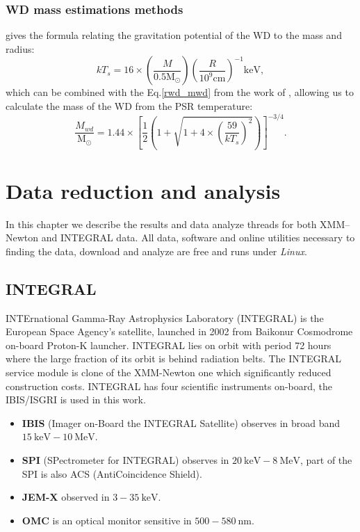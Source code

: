 \documentclass[oneside,a4paper,11pt]{report}
\begin{document}
\subsection{WD mass estimations methods}
\citet{1973PThPh..49.1184A_aizu} gives the formula relating the gravitation potential of the WD to the mass and radius:
\begin{equation}
 \label{aizu1}
kT_s = 16 \times \left( \frac{M}{0.5\mathrm{M_{\odot}}}\right)\left( \frac{R}{10^9 \mathrm{cm}}\right)^{-1} \mathrm{keV},
\end{equation}
which can be combined with the Eq.\eqref{rwd_mwd} from the work of \citet{1972ApJ...175..417N}, allowing
us to calculate the mass of the WD from the PSR temperature:   
\begin{equation}
 \label{MWD:1}
\frac{M_{wd}}{\mathrm{M_{\odot}}} = 1.44\times \left[\frac{1}{2} \left( 1+ \sqrt{1+4\times\left(\frac{59}{kT_s}\right)^2} \right) \right]^{-3/4}.
\end{equation}



\chapter{Data reduction and analysis}
In this chapter we describe the results and data analyze threads for both XMM--Newton and INTEGRAL data. 
All data, software and online utilities necessary to finding the data, download and analyze are free 
and runs under \textit{Linux}.  

\section{INTEGRAL}
INTErnational Gamma-Ray Astrophysics Laboratory (INTEGRAL) is the European Space Agency's satellite, 
launched in 2002 from Baikonur Cosmodrome on-board Proton-K launcher. INTEGRAL lies on orbit with 
period 72 hours where the large fraction of its orbit is behind radiation belts. The INTEGRAL service 
module is clone of the XMM-Newton one which significantly reduced construction costs. 
INTEGRAL has four scientific instruments on-board, the IBIS/ISGRI is used in this work. 
\begin{itemize}
 \item \textbf{IBIS} (Imager on-Board the INTEGRAL Satellite) observes in broad band $15\:\mathrm{keV} -
10\:\mathrm{MeV}$.
\item \textbf{SPI} (SPectrometer for INTEGRAL) observes in $20\:\mathrm{keV}-8\:\mathrm{MeV}$, part of the SPI is
also ACS (AntiCoincidence Shield).
\item \textbf{JEM-X} observed in $3 - 35\:\mathrm{keV}$.
\item \textbf{OMC} is an optical monitor sensitive in $500-580\:\mathrm{nm}$.
\end{itemize}
\end{document}
